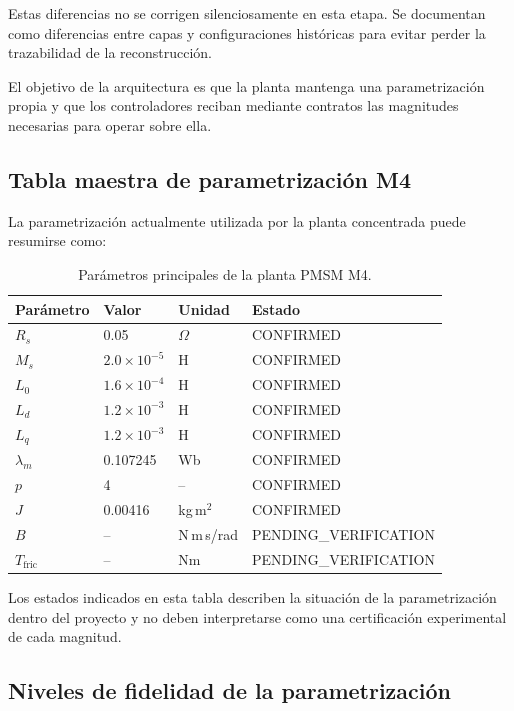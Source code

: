 Estas diferencias no se corrigen silenciosamente en esta etapa. Se documentan como diferencias entre capas y configuraciones históricas para evitar perder la trazabilidad de la reconstrucción.

El objetivo de la arquitectura es que la planta mantenga una parametrización propia y que los controladores reciban mediante contratos las magnitudes necesarias para operar sobre ella.

\subsection{Tabla maestra de parametrización M4}

La parametrización actualmente utilizada por la planta concentrada puede resumirse como:

\begin{table}[H]
\centering
\caption{Parámetros principales de la planta PMSM M4.}
\label{tab:parametros_m4}
\begin{tabular}{llll}
\toprule
Parámetro & Valor & Unidad & Estado \\
\midrule
$R_s$ & 0.05 & $\Omega$ & CONFIRMED \\
$M_s$ & $2.0\times10^{-5}$ & H & CONFIRMED \\
$L_0$ & $1.6\times10^{-4}$ & H & CONFIRMED \\
$L_d$ & $1.2\times10^{-3}$ & H & CONFIRMED \\
$L_q$ & $1.2\times10^{-3}$ & H & CONFIRMED \\
$\lambda_m$ & 0.107245 & Wb & CONFIRMED \\
$p$ & 4 & -- & CONFIRMED \\
$J$ & 0.00416 & kg\,m$^2$ & CONFIRMED \\
$B$ & -- & N\,m\,s/rad & PENDING\_VERIFICATION \\
$T_{\mathrm{fric}}$ & -- & Nm & PENDING\_VERIFICATION \\
\bottomrule
\end{tabular}
\end{table}

Los estados indicados en esta tabla describen la situación de la parametrización dentro del proyecto y no deben interpretarse como una certificación experimental de cada magnitud.

\subsection{Niveles de fidelidad de la parametrización}

